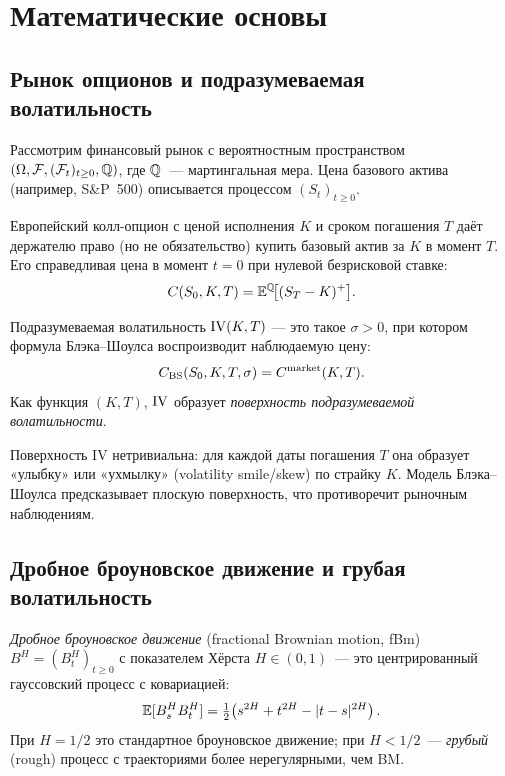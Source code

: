 
\section{Математические основы}
\label{sec:math}

\subsection{Рынок опционов и подразумеваемая волатильность}

Рассмотрим финансовый рынок с вероятностным пространством
$(\Omega, \mathcal{F}, (\mathcal{F}_t)_{t\geq 0}, \mathbb{Q})$, где $\mathbb{Q}$~--- мартингальная мера.
Цена базового актива (например, S\&P~500) описывается процессом $(S_t)_{t\geq 0}$.

\begin{definition}
  Европейский колл-опцион с ценой исполнения $K$ и сроком погашения $T$ даёт
  держателю право (но не обязательство) купить базовый актив за $K$ в момент $T$.
  Его справедливая цена в момент $t=0$ при нулевой безрисковой ставке:
  \[
    C(S_0, K, T) = \mathbb{E}^{\mathbb{Q}}\!\bigl[(S_T - K)^+\bigr].
  \]
\end{definition}

\begin{definition}
  Подразумеваемая волатильность $\mathrm{IV}(K, T)$ --- это такое $\sigma > 0$, при
  котором формула Блэка--Шоулса воспроизводит наблюдаемую цену:
  \[
    C_{\mathrm{BS}}(S_0, K, T, \sigma) = C^{\mathrm{market}}(K, T).
  \]
  Как функция $(K, T)$, $\mathrm{IV}$ образует \textit{поверхность подразумеваемой
  волатильности}.
\end{definition}

Поверхность IV нетривиальна: для каждой даты погашения $T$ она образует
«улыбку» или «ухмылку» (volatility smile/skew) по страйку $K$.
Модель Блэка--Шоулса предсказывает плоскую поверхность, что противоречит
рыночным наблюдениям.

\subsection{Дробное броуновское движение и грубая волатильность}

\begin{definition}
  \textit{Дробное броуновское движение} (fractional Brownian motion, fBm)
  $B^H = (B^H_t)_{t\geq 0}$ с показателем Хёрста $H \in (0,1)$~--- это
  центрированный гауссовский процесс с ковариацией:
  \[
    \mathbb{E}[B^H_s B^H_t]
    = \tfrac{1}{2}\!\left(s^{2H} + t^{2H} - |t-s|^{2H}\right).
  \]
  При $H = 1/2$ это стандартное броуновское движение; при $H < 1/2$~---
  \textit{грубый} (rough) процесс с траекториями более нерегулярными, чем BM.
\end{definition}

